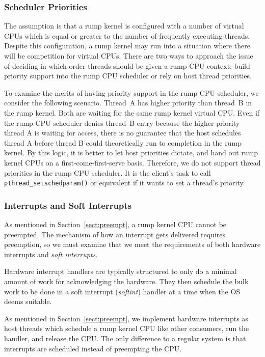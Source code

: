 \subsubsection*{Scheduler Priorities}

The assumption is that a rump kernel is configured with a number
of virtual CPUs which is equal or greater to the number of frequently
executing threads.  Despite this configuration, a rump kernel may run
into a situation where there will be competition for virtual CPUs.
There are two ways to approach the issue of deciding in which order
threads should be given a rump CPU context: build priority support into
the rump CPU scheduler or rely on host thread priorities.

To examine the merits of having priority support in the rump CPU
scheduler, we consider the following scenario.  Thread~A has higher
priority than thread~B in the rump kernel.  Both are waiting for
the same rump kernel virtual CPU.  Even if the rump CPU scheduler
denies thread~B entry because the higher priority thread A is
waiting for access, there is no guarantee that the host schedules
thread A before thread B could theoretically run to completion in
the rump kernel.  By this logic, it is better to let host priorities
dictate, and hand out rump kernel CPUs on a first-come-first-serve
basis.  Therefore, we do not support thread priorities in the rump
CPU scheduler.  It is the client's task to call
\verb+pthread_setschedparam()+ or equivalent if it wants to set a
thread's priority.

\subsubsection{Interrupts and Soft Interrupts}

As mentioned in Section~\ref{sect:preempt}, a rump kernel
CPU cannot be preempted.  The mechanism of how an interrupt gets
delivered requires preemption, so we must examine that we meet the
requirements of both hardware interrupts and \textit{soft interrupts}.

Hardware interrupt handlers are typically structured to only do a
minimal amount of work for acknowledging the hardware.  They then
schedule the bulk work to be done in a soft interrupt (\textit{softint})
handler at a time when the OS deems suitable.

As mentioned in Section~\ref{sect:preempt}, we implement hardware
interrupts as host threads which schedule a rump kernel CPU like
other consumers, run the handler, and release the CPU.  The only
difference to a regular system is that interrupts are scheduled
instead of preempting the CPU.

